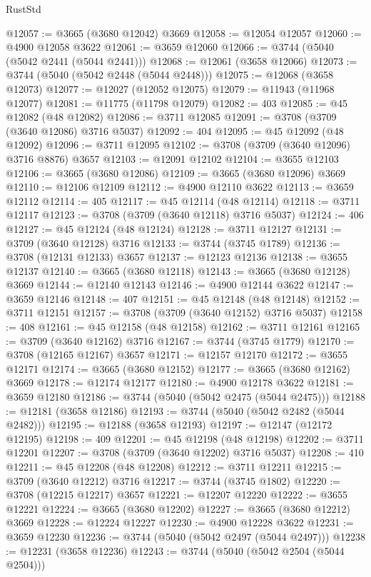 \begin{lexlean}{RustStd}
\begin{coremodule}
@12057 := @3665 (@3680 @12042) @3669
@12058 := @12054 @12057
@12060 := @4900 @12058 @3622
@12061 := @3659 @12060
@12066 := @3744 (@5040 (@5042 @2441 (@5044 @2441)))
@12068 := @12061 (@3658 @12066)
@12073 := @3744 (@5040 (@5042 @2448 (@5044 @2448)))
@12075 := @12068 (@3658 @12073)
@12077 := @12027 (@12052 @12075)
@12079 := @11943 (@11968 @12077)
@12081 := @11775 (@11798 @12079)
@12082 := 403
@12085 := @45 @12082 (@48 @12082)
@12086 := @3711 @12085
@12091 := @3708 (@3709 (@3640 @12086) @3716 @5037)
@12092 := 404
@12095 := @45 @12092 (@48 @12092)
@12096 := @3711 @12095
@12102 := @3708 (@3709 (@3640 @12096) @3716 @8876) @3657
@12103 := @12091 @12102
@12104 := @3655 @12103
@12106 := @3665 (@3680 @12086)
@12109 := @3665 (@3680 @12096) @3669
@12110 := @12106 @12109
@12112 := @4900 @12110 @3622
@12113 := @3659 @12112
@12114 := 405
@12117 := @45 @12114 (@48 @12114)
@12118 := @3711 @12117
@12123 := @3708 (@3709 (@3640 @12118) @3716 @5037)
@12124 := 406
@12127 := @45 @12124 (@48 @12124)
@12128 := @3711 @12127
@12131 := @3709 (@3640 @12128) @3716
@12133 := @3744 (@3745 @1789)
@12136 := @3708 (@12131 @12133) @3657
@12137 := @12123 @12136
@12138 := @3655 @12137
@12140 := @3665 (@3680 @12118)
@12143 := @3665 (@3680 @12128) @3669
@12144 := @12140 @12143
@12146 := @4900 @12144 @3622
@12147 := @3659 @12146
@12148 := 407
@12151 := @45 @12148 (@48 @12148)
@12152 := @3711 @12151
@12157 := @3708 (@3709 (@3640 @12152) @3716 @5037)
@12158 := 408
@12161 := @45 @12158 (@48 @12158)
@12162 := @3711 @12161
@12165 := @3709 (@3640 @12162) @3716
@12167 := @3744 (@3745 @1779)
@12170 := @3708 (@12165 @12167) @3657
@12171 := @12157 @12170
@12172 := @3655 @12171
@12174 := @3665 (@3680 @12152)
@12177 := @3665 (@3680 @12162) @3669
@12178 := @12174 @12177
@12180 := @4900 @12178 @3622
@12181 := @3659 @12180
@12186 := @3744 (@5040 (@5042 @2475 (@5044 @2475)))
@12188 := @12181 (@3658 @12186)
@12193 := @3744 (@5040 (@5042 @2482 (@5044 @2482)))
@12195 := @12188 (@3658 @12193)
@12197 := @12147 (@12172 @12195)
@12198 := 409
@12201 := @45 @12198 (@48 @12198)
@12202 := @3711 @12201
@12207 := @3708 (@3709 (@3640 @12202) @3716 @5037)
@12208 := 410
@12211 := @45 @12208 (@48 @12208)
@12212 := @3711 @12211
@12215 := @3709 (@3640 @12212) @3716
@12217 := @3744 (@3745 @1802)
@12220 := @3708 (@12215 @12217) @3657
@12221 := @12207 @12220
@12222 := @3655 @12221
@12224 := @3665 (@3680 @12202)
@12227 := @3665 (@3680 @12212) @3669
@12228 := @12224 @12227
@12230 := @4900 @12228 @3622
@12231 := @3659 @12230
@12236 := @3744 (@5040 (@5042 @2497 (@5044 @2497)))
@12238 := @12231 (@3658 @12236)
@12243 := @3744 (@5040 (@5042 @2504 (@5044 @2504)))

\end{coremodule}
\end{lexlean}
